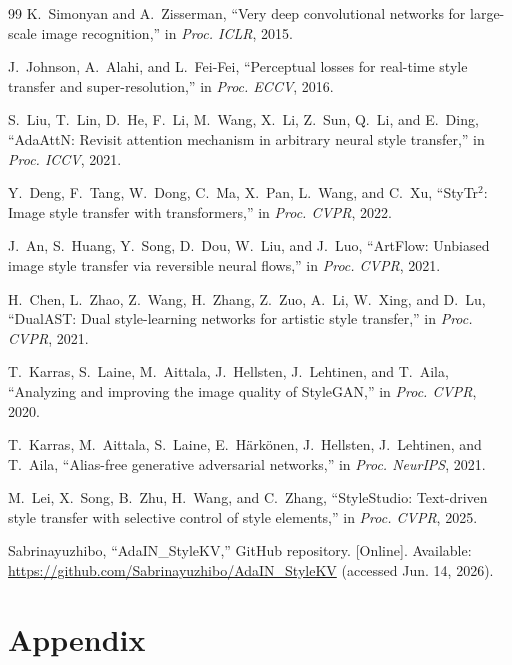 \documentclass[10pt,twocolumn]{article}
\begin{document}
\begin{thebibliography}{99}
 K.~Simonyan and A.~Zisserman, ``Very deep convolutional networks for large-scale image recognition,'' in \emph{Proc. ICLR}, 2015.

 J.~Johnson, A.~Alahi, and L.~Fei-Fei, ``Perceptual losses for real-time style transfer and super-resolution,'' in \emph{Proc. ECCV}, 2016.

 S.~Liu, T.~Lin, D.~He, F.~Li, M.~Wang, X.~Li, Z.~Sun, Q.~Li, and E.~Ding, ``AdaAttN: Revisit attention mechanism in arbitrary neural style transfer,'' in \emph{Proc. ICCV}, 2021.

 Y.~Deng, F.~Tang, W.~Dong, C.~Ma, X.~Pan, L.~Wang, and C.~Xu, ``StyTr$^2$: Image style transfer with transformers,'' in \emph{Proc. CVPR}, 2022.

 J.~An, S.~Huang, Y.~Song, D.~Dou, W.~Liu, and J.~Luo, ``ArtFlow: Unbiased image style transfer via reversible neural flows,'' in \emph{Proc. CVPR}, 2021.

 H.~Chen, L.~Zhao, Z.~Wang, H.~Zhang, Z.~Zuo, A.~Li, W.~Xing, and D.~Lu, ``DualAST: Dual style-learning networks for artistic style transfer,'' in \emph{Proc. CVPR}, 2021.

 T.~Karras, S.~Laine, M.~Aittala, J.~Hellsten, J.~Lehtinen, and T.~Aila, ``Analyzing and improving the image quality of StyleGAN,'' in \emph{Proc. CVPR}, 2020.

 T.~Karras, M.~Aittala, S.~Laine, E.~H\"{a}rk\"{o}nen, J.~Hellsten, J.~Lehtinen, and T.~Aila, ``Alias-free generative adversarial networks,'' in \emph{Proc. NeurIPS}, 2021.

 M.~Lei, X.~Song, B.~Zhu, H.~Wang, and C.~Zhang, ``StyleStudio: Text-driven style transfer with selective control of style elements,'' in \emph{Proc. CVPR}, 2025.

 Sabrinayuzhibo, ``AdaIN\_StyleKV,'' GitHub repository. [Online]. Available: \url{https://github.com/Sabrinayuzhibo/AdaIN_StyleKV} (accessed Jun. 14, 2026).

\end{thebibliography}

\FloatBarrier
\section*{Appendix}
\begingroup
\titlespacing*{\subsection}{0pt}{0.45em}{0.2em}
\end{document}
